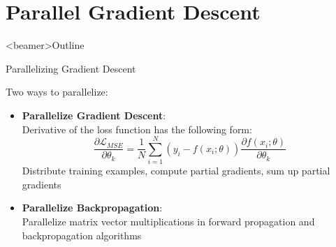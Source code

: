 \section{Parallel Gradient Descent}

\begin{frame}<beamer>{Outline}
\end{frame}

\begin{frame}{Parallelizing Gradient Descent}

Two ways to parallelize:
\begin{itemize}
	\item \textbf{Parallelize Gradient Descent}: \\
	Derivative of the loss function has the following form:
	\begin{equation*}
	\frac{\partial \mathcal{L}_{MSE}}{\partial \theta_k} = \frac{1}{N} \sum_{i=1}^N ( y_i - f(x_i; \theta)) \frac{\partial f(x_i; \theta)}{\partial \theta_k}
	\end{equation*}
Distribute training examples, compute partial gradients, sum up partial gradients
    \item \textbf{Parallelize Backpropagation}: \\
    Parallelize matrix vector multiplications in forward propagation and backpropagation algorithms
        \end{itemize}
\end{frame}
